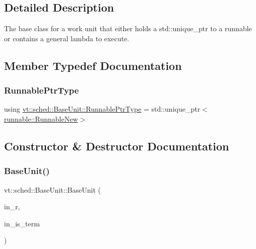 \subsection{Detailed Description}
The base class for a work unit that either holds a {\ttfamily std\+::unique\+\_\+ptr} to a runnable or contains a general lambda to execute. 

\subsection{Member Typedef Documentation}
\mbox{\label{structvt_1_1sched_1_1_base_unit_a9be5d5adaeb011c8ef82f751485ebf9a}} 
\subsubsection{\texorpdfstring{Runnable\+Ptr\+Type}{RunnablePtrType}}
{\footnotesize\ttfamily using \hyperlink{structvt_1_1sched_1_1_base_unit_a9be5d5adaeb011c8ef82f751485ebf9a}{vt\+::sched\+::\+Base\+Unit\+::\+Runnable\+Ptr\+Type} =  std\+::unique\+\_\+ptr$<$\hyperlink{structvt_1_1runnable_1_1_runnable_new}{runnable\+::\+Runnable\+New}$>$}



\subsection{Constructor \& Destructor Documentation}
\mbox{\label{structvt_1_1sched_1_1_base_unit_a3474174416a6c22a52001f0a65247b52}} 
\subsubsection{\texorpdfstring{Base\+Unit()}{BaseUnit()}\hspace{0.1cm}{\footnotesize\ttfamily [1/2]}}
{\footnotesize\ttfamily vt\+::sched\+::\+Base\+Unit\+::\+Base\+Unit (\begin{DoxyParamCaption}\item[{\hyperlink{structvt_1_1sched_1_1_base_unit_a9be5d5adaeb011c8ef82f751485ebf9a}{Runnable\+Ptr\+Type}}]{in\+\_\+r,  }\item[{bool}]{in\+\_\+is\+\_\+term }\end{DoxyParamCaption})\hspace{0.3cm}{\ttfamily [inline]}}



